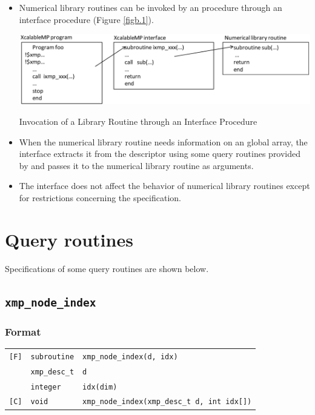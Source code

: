\begin{itemize}

 \item Numerical library routines can be invoked by an {\XMP} procedure
       through an interface procedure (Figure \ref{figb.1}).

 \begin{myfigure}
  \includegraphics[scale=0.45]{figs/figb.1.eps}
  \caption{Invocation of a Library Routine through an Interface Procedure}
  \label{figb.1}
 \end{myfigure}

 \item When the numerical library routine needs information on an global
       array, the interface extracts it from the descriptor using some
       query routines provided by {\XMP} and passes it to the
       numerical library routine as arguments.
%
 \item The interface does not affect the behavior of numerical library
       routines except for restrictions concerning the {\XMP}
       specification.
\end{itemize}


\section{Query routines}

Specifications of some query routines are shown below.

\subsection{\tt xmp\_node\_index}

\subsubsection*{Format}

\begin{tabular}{lll}

\verb![F]!& {\tt subroutine}& {\tt xmp\_node\_index(d, idx)}\\
          & {\tt xmp\_desc\_t} & {\tt d}\\
          & {\tt integer} & {\tt idx(dim)}\\

\verb![C]!&  {\tt void}& {\tt xmp\_node\_index(xmp\_desc\_t d, int idx[])}\\

\end{tabular}

